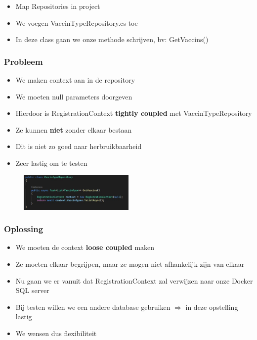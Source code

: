 \documentclass{article}
\begin{document}
\begin{itemize}
    \item Map Repositories in project
    \item We voegen VaccinTypeRepository.cs toe
    \item In deze class gaan we onze methode schrijven, bv: GetVaccins()
\end{itemize}

\subsubsection{Probleem}

\begin{itemize}
    \item We maken context aan in de repository
    \item We moeten null parameters doorgeven
    \item Hierdoor is RegistrationContext \textbf{tightly coupled} met VaccinTypeRepository
    \item Ze kunnen \textbf{niet} zonder elkaar bestaan
    \item Dit is niet zo goed naar herbruikbaarheid
    \item Zeer lastig om te testen
\end{itemize}

\begin{figure}[H]
    \centering
    \includegraphics[width=0.5\textwidth]{repositories-2.png}
    \caption{}
\end{figure}


\subsubsection{Oplossing}

\begin{itemize}
    \item We moeten de context \textbf{loose coupled} maken
    \item Ze moeten elkaar begrijpen, maar ze mogen niet afhankelijk zijn van elkaar
    \item Nu gaan we er vanuit dat RegistrationContext zal verwijzen naar onze Docker SQL server
    \item Bij testen willen we een andere database gebruiken $\Rightarrow$ in deze opstelling lastig
    \item We wensen dus flexibiliteit
\end{itemize}
\end{document}
